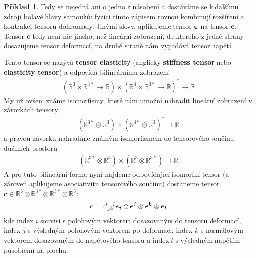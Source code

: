 \documentclass[a5paper,12pt]{amsbook}
\theoremstyle{definition}
\newtheorem{example}{Příklad}[chapter]
\newcommand{\myvec}[1]{\bm{#1}}
\newcommand{\myspace}[1]{\mathbb{#1}}
\begin{document}
\begin{example}
Tedy se nejedná ani o jedno z násobení a dostáváme se k dalšímu zdroji bolavé
hlavy samouků: fyzici tímto zápisem rovnou kombinují rozšíření a kontrakci
tensoru dohromady. Jinými slovy, aplikujeme tensor $\myvec{\varepsilon}$
na tensor $\myvec{c}$. Tensor $\myvec{c}$ tedy není nic jiného, než lineární
zobrazení, do kterého z jedné strany dosazujeme tensor deformací, na druhé straně
nám vypadává tensor napětí.

Tento tensor se nazývá \textbf{tensor elasticity} (anglicky \textbf{stiffness tensor}
nebo \textbf{elasticity tensor}) a odpovídá bilineárnímu zobrazení
\begin{equation*}
\begin{split}
(\myspace{R}^{3}\times\myspace{R}^{3*}\rightarrow\myspace{R})
\times
(\myspace{R}^{3}\times\myspace{R}^{3*}\rightarrow\myspace{R})^*
\rightarrow\myspace{R}
\end{split}
\end{equation*}
My už ovšem známe isomorfismy, které nám umožní nahradit lineární zobrazení
v závorkách tensory
\begin{equation*}
\begin{split}
(\myspace{R}^{3*}\otimes\myspace{R}^{3})
\times
(\myspace{R}^{3*}\otimes\myspace{R}^{3})^*
\rightarrow\myspace{R}
\end{split}
\end{equation*}
a pravou závorku nahradíme známým isomorfismem do tensorového součinu
duálních prostorů
\begin{equation*}
\begin{split}
(\myspace{R}^{3*}\otimes\myspace{R}^{3})
\times
(\myspace{R}^{3}\otimes\myspace{R}^{3*})
\rightarrow\myspace{R}
\end{split}
\end{equation*}
A pro tuto bilineární formu nyní najdeme odpovídající isomorfní tensor
(a zároveň aplikujeme asociativitu tensorového součinu) dostaneme
tensor $\myvec{c}\in\myspace{R}^3\otimes\myspace{R}^{3*}\otimes\myspace{R}^{3*}\otimes\myspace{R}^3$:
\begin{equation*}
\begin{split}
\myvec{c} = c\indices{^i_j_k^l}\myvec{e_i}\otimes\myvec{\epsilon^j}\otimes\myvec{\epsilon^k}\otimes\myvec{e_l}
\end{split}
\end{equation*}
kde index $i$ souvisí s polohovým vektorem dosazovaným do tensoru deformací, index $j$ s výsledným
polohovým vektorem po deformaci, index $k$ s normálovým vektorem dosazovaným do napěťového
tensoru a index $l$ s výsledným napětím působícím na plochu.


\end{example}
\end{document}
